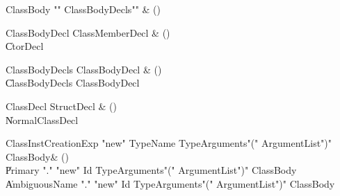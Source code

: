 \begin{bbgrammar}

ClassBody \label{prod:ClassBody}  \: \xcd"{" ClassBodyDecls\opt \xcd"}" & () \\


\end{bbgrammar}

\begin{bbgrammar}

ClassBodyDecl \label{prod:ClassBodyDecl}  \: ClassMemberDecl & () \\

    \| CtorDecl \\

\end{bbgrammar}

\begin{bbgrammar}

ClassBodyDecls \label{prod:ClassBodyDecls}  \: ClassBodyDecl & () \\

    \| ClassBodyDecls ClassBodyDecl \\

\end{bbgrammar}

\begin{bbgrammar}

ClassDecl \label{prod:ClassDecl}  \: StructDecl & () \\

    \| NormalClassDecl \\

\end{bbgrammar}

\begin{bbgrammar}

ClassInstCreationExp \label{prod:ClassInstCreationExp}  \: \xcd"new" TypeName TypeArguments\opt \xcd"(" ArgumentList\opt \xcd")" ClassBody\opt & () \\

    \| Primary \xcd"." \xcd"new" Id TypeArguments\opt \xcd"(" ArgumentList\opt \xcd")" ClassBody\opt \\
    \| AmbiguousName \xcd"." \xcd"new" Id TypeArguments\opt \xcd"(" ArgumentList\opt \xcd")" ClassBody\opt \\

\end{bbgrammar}

